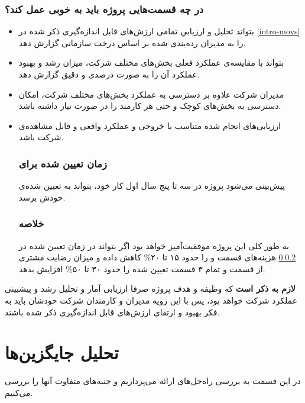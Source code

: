 \documentclass[12pt, dvipsnames, svgnames, x11names,]{article}
\begin{document}
\subsubsection{در چه قسمت‌هایی پروژه باید به خوبی عمل کند؟}
\begin{itemize}
    \item 
    بتواند تحلیل و ارزیابیِ تمامی ارزش‌های قابل‌ اندازه‌گیری ذکر شده در \ref{intro-movs} را به مدیران رده‌بندی‌ شده بر اساس درخت سازمانی گزارش دهد.
    \item 
    بتواند با مقایسه‌ی عملکرد فعلی بخش‌های مختلف شرکت، میزان رشد و بهبود عملکرد آن را به صورت درصدی و دقیق گزارش دهد.
    \item
    مدیران شرکت علاوه‌ بر دسترسی به عملکرد بخش‌های مختلف شرکت، امکان دسترسی به بخش‌های کوچک و حتی هر کارمند را در صورت نیاز داشته باشد.

    \item 
    ارزیابی‌های انجام شده متناسب‌ با خروجی و عملکرد واقعی و قابل مشاهده‌ی شرکت باشد.
    
\subsubsection{زمان تعیین شده برای }\label{time}
پیش‌بینی می‌شود پروژه در سه تا پنج سال اول کار خود، بتواند به  تعیین شده‌ی خودش برسد.
\subsubsection{خلاصه‌} 
به طور کلی این پروژه موفقیت‌آمیز خواهد بود اگر بتواند در زمان تعیین شده در \ref{time}
هزینه‌های قسمت  و 
را حدود ۱۵ تا ۲۰\% کاهش داده و میزان رضایت مشتری از قسمت  و تمام ۳ قسمت تعیین شده را حدود ۳۰ تا ۵۰\% افزایش بدهد.
\end{itemize}

\textbf{لازم به ذکر است}
 که وظیفه و هدف پروژه صرفا ارزیابی آمار و تحلیل رشد و پیشبینی عملکرد شرکت خواهد بود، پس با این رویه مدیران و کارمندان شرکت خودشان باید به فکر بهبود و ارتقای ارزش‌های قابل اندازه‌گیری ذکر شده باشند.
 
\section{تحلیل جایگزین‌ها}
در این قسمت به بررسی راه‌حل‌های ارائه می‌پردازیم و جنبه‌های متفاوت‌ آنها را بررسی می‌کنیم.
\end{document}
